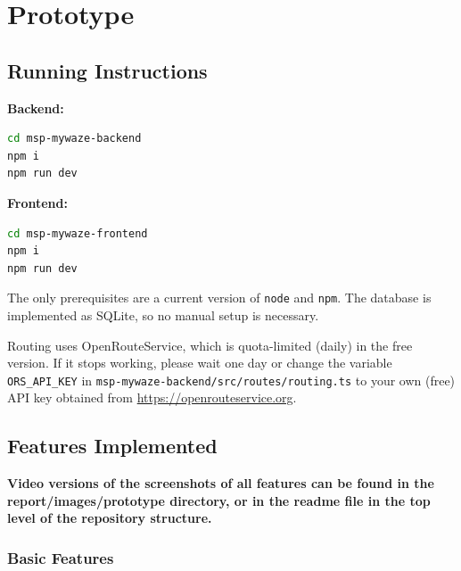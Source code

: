 \documentclass{article}
\begin{document}
\clearpage

\section*{Prototype}

\subsection*{Running Instructions}

\textbf{Backend:}
\begin{lstlisting}[language=bash]
cd msp-mywaze-backend
npm i
npm run dev
\end{lstlisting}

\textbf{Frontend:}
\begin{lstlisting}[language=bash]
cd msp-mywaze-frontend
npm i
npm run dev
\end{lstlisting}

The only prerequisites are a current version of \texttt{node} and \texttt{npm}. The database is implemented as SQLite, so no manual setup is necessary.

Routing uses OpenRouteService, which is quota-limited (daily) in the free version. If it stops working, please wait one day or change the variable \texttt{ORS\_API\_KEY} in \texttt{msp-mywaze-backend/src/routes/routing.ts} to your own (free) API key obtained from \url{https://openrouteservice.org}.

\subsection*{Features Implemented}

\textbf{Video versions of the screenshots of all features can be found in the report/images/prototype directory, or in the readme file in the top level of the repository structure.}

\subsubsection*{Basic Features}
\end{document}
